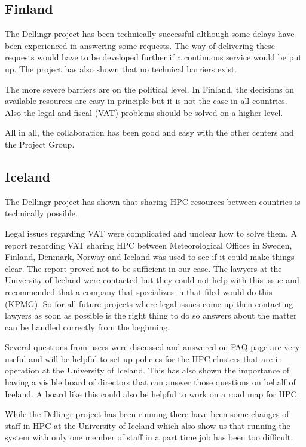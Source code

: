 \documentclass{article}
\newcommand{\dell}{Dellingr\xspace}
\begin{document}
\subsection{Finland}

The \dell project has been technically successful although some delays have been experienced in answering some requests. 
The way of delivering these requests would have to be developed further if a continuous service would be put up. 
The project has also shown that no technical barriers exist.

The more severe barriers are on the political level. 
In Finland, the decisions on available resources are easy in principle but it is not the case in all countries. 
Also the legal and fiscal (VAT) problems should be solved on a higher level.

All in all, the collaboration has been good and easy with the other centers and the Project Group. 

\subsection{Iceland}

The \dell project has shown that sharing HPC resources between countries is technically possible.

Legal issues regarding VAT were complicated and unclear how to solve them. 
A report regarding VAT sharing HPC between Meteorological Offices in Sweden, Finland, Denmark, Norway and Iceland was used to see if it could make things clear. 
The report proved not to be sufficient in our case. 
The lawyers at the University of Iceland were contacted but they could not help with this issue and recommended that a company that specializes in that filed would do this (KPMG). 
So for all future projects where legal issues come up then contacting lawyers as soon as possible is the right thing to do so answers about the matter can be handled correctly from the beginning.

Several questions from users were discussed and answered on FAQ page are very useful and will be helpful to set up policies for the HPC clusters that are in operation at the University of Iceland. 
This has also shown the importance of having a visible board of directors that can answer those questions on behalf of Iceland. 
A board like this could also be helpful to work on a road map for HPC.

While the \dell project has been running there have been some changes of staff in HPC at the University of Iceland which also show us that running the system with only one member of staff in a part time job has been too difficult.
\end{document}
